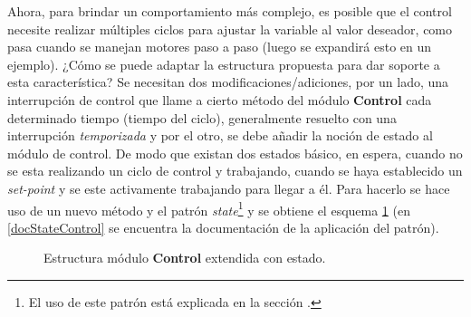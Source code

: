 Ahora, para brindar un comportamiento más complejo, es posible que el control necesite realizar múltiples ciclos para ajustar la variable al valor deseador, como pasa cuando se manejan motores paso a paso (luego se expandirá esto en un ejemplo). ¿Cómo se puede adaptar la estructura propuesta para dar soporte a esta característica? Se necesitan dos modificaciones/adiciones, por un lado, una interrupción de control que llame a cierto método del módulo \textbf{Control} cada determinado tiempo (tiempo del ciclo), generalmente resuelto con una interrupción \textit{temporizada} y por el otro, se debe añadir la noción de estado al módulo de control. De modo que existan dos estados básico, en espera, cuando no se esta realizando un ciclo de control y trabajando, cuando se haya establecido un \textit{set-point} y se este activamente trabajando para llegar a él. Para hacerlo se hace uso de un nuevo método y el patrón \textit{state}\footnote{El uso de este patrón está explicada en la sección .} y se obtiene el esquema \ref{controlState} (en \ref{docStateControl} se encuentra la documentación de la aplicación del patrón).

\begin{figure}[H]
\caption{Estructura módulo \textbf{Control} extendida con estado.}
\label{controlState}
\begin{center}
\end{center}
\end{figure}

